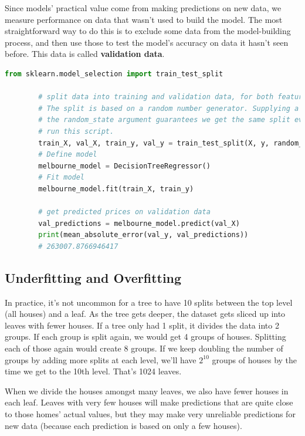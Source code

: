 \documentclass[11pt]{article}
\begin{document}
    Since models' practical value come from making predictions on new data, we measure performance on data that wasn't used to build the model.
    The most straightforward way to do this is to exclude some data from the model-building process, and then use those to test the model's accuracy on data it hasn't seen before.
    This data is called \textbf{validation data}.

    \begin{lstlisting}[style=light, language=Python,label={lst:vectorimg},caption=The mean absolute error calculcation]
        from sklearn.model_selection import train_test_split

        # split data into training and validation data, for both features and target
        # The split is based on a random number generator. Supplying a numeric value to
        # the random_state argument guarantees we get the same split every time we
        # run this script.
        train_X, val_X, train_y, val_y = train_test_split(X, y, random_state = 0)
        # Define model
        melbourne_model = DecisionTreeRegressor()
        # Fit model
        melbourne_model.fit(train_X, train_y)

        # get predicted prices on validation data
        val_predictions = melbourne_model.predict(val_X)
        print(mean_absolute_error(val_y, val_predictions))
        # 263007.8766946417
    \end{lstlisting}

    \subsection{Underfitting and Overfitting}\label{subsec:underfitting_overfitting}
    In practice, it's not uncommon for a tree to have 10 splits between the top level (all houses) and a leaf.
    As the tree gets deeper, the dataset gets sliced up into leaves with fewer houses.
    If a tree only had 1 split, it divides the data into 2 groups.
    If each group is split again, we would get 4 groups of houses.
    Splitting each of those again would create 8 groups.
    If we keep doubling the number of groups by adding more splits at each level, we'll have \(2^10\) groups of houses by the time we get to the 10th level.
    That's 1024 leaves.

    When we divide the houses amongst many leaves, we also have fewer houses in each leaf.
    Leaves with very few houses will make predictions that are quite close to those homes' actual values, but they may make very unreliable predictions for new data (because each prediction is based on only a few houses).
\end{document}
